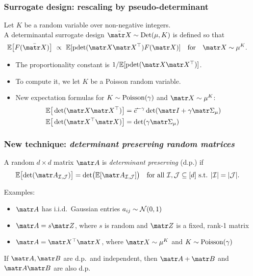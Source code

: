 \begin{subframe}
  \frametitle{Surrogate design: rescaling by pseudo-determinant}
  \begin{definition}
    Let $K$ be a random variable over non-negative integers. \\
    A determinantal surrogate design
    $\Xb\sim \Det(\mu,K)$ is defined so that
\begin{align*}
  \E\big[F(\Xb)\big]\  \propto\ \E[\pdet(\X\X^\top)F(\X)]
  \quad\text{for}\quad\X\sim\mu^K.
\end{align*}
\end{definition}
\begin{itemize}
  \pause
\item The proportionality constant is $1/\E[\pdet(\X\X^\top)]$.
\pause
\item To compute it, we let $K$ be a Poisson random variable.
\pause
\item New expectation formulas for $K\sim\operatorname{Poisson}(\gamma)$ and $\X\sim\mu^K$:
\begin{align*}
  \E\big[\det(\X\X^\top)\big]
  &= \ee^{-\gamma}\det(\I+\gamma\Sigmab_\mu)\\
  \E\big[\det(\X^\top\X)\big]
  &= \det(\gamma\Sigmab_\mu)
\end{align*}
\end{itemize}

\end{subframe}

\begin{subframe}
  \frametitle{New technique: \textit{determinant preserving random
      matrices}}
\begin{definition}
A random $d\times d$ matrix $\A$ is \emph{determinant
  preserving} (d.p.) if
\begin{align*}
  \E\big[\!\det(\A_{\Ic,\Jc})\big] =
  \det\!\big(\E[\A_{\Ic,\Jc}]\big)\quad \text{for all }\Ic,\Jc\subseteq
  [d]\text{ s.t. }|\Ic|=|\Jc|.
\end{align*}
\vspace{-7mm}
\end{definition}
\pause
Examples:
  \begin{itemize}
  \item $\A$ has i.i.d.~Gaussian entries  $a_{ij}\sim\mathcal{N}(0,1)$\pause    
  \item $\A = s\Z$, where $s$ is random and $\Z$ is a fixed,
    rank-1 matrix\pause
    \item $\A=\X^\top\X$, where $\X\sim\mu^K$ and $K\sim\operatorname{Poisson}(\gamma)$
    \end{itemize}
    \pause
  \begin{theorem}
    If $\A,\B$ are d.p.~and independent, then $\A+\B$ and $\A\B$ are
    also d.p.
  \end{theorem}
\end{subframe}